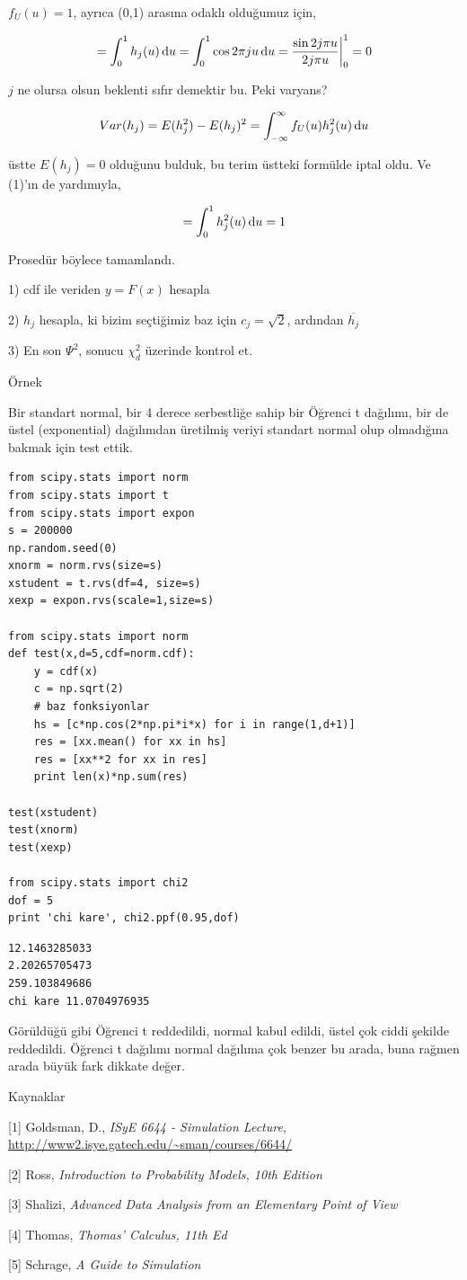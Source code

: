 \documentclass[12pt,fleqn]{article}\usepackage{../../common}
\begin{document}
$f_U(u) = 1$, ayrıca (0,1) arasına odaklı olduğumuz için,

$$
= \int _{0}^{1} h_j(u) \,\mathrm{d} u = \int_{0}^{1} \cos 2\pi j u \,\mathrm{d} u
= \frac{\sin 2j\pi u }{2j\pi u} \bigg|_{0}^{1} = 0
$$

$j$ ne olursa olsun beklenti sıfır demektir bu. Peki varyans? 

$$
Var(h_j) = E(h_j^2)-E(h_j)^2 = \int _{-\infty}^{\infty} f_U(u)h_j^2(u) \,\mathrm{d} u
$$

üstte $E(h_j)=0$ olduğunu bulduk, bu terim üstteki formülde iptal oldu. Ve
(1)'ın de yardımıyla,

$$  = \int_{0}^{1}  h_j^2(u) \,\mathrm{d} u = 1$$

Prosedür böylece tamamlandı. 

1) cdf ile veriden $y=F(x)$ hesapla

2) $h_j$ hesapla, ki bizim seçtiğimiz baz için $c_j = \sqrt{2}$, ardından $\overline{h_j}$

3) En son $\Psi^2$, sonucu $\chi^2_d$ üzerinde kontrol et. 

Örnek

Bir standart normal, bir 4 derece serbestliğe sahip bir Öğrenci t dağılımı,
bir de üstel (exponential) dağılımdan üretilmiş veriyi standart normal olup
olmadığına bakmak için test ettik. 

\begin{verbatim}
from scipy.stats import norm
from scipy.stats import t
from scipy.stats import expon
s = 200000
np.random.seed(0)
xnorm = norm.rvs(size=s)
xstudent = t.rvs(df=4, size=s)
xexp = expon.rvs(scale=1,size=s)

from scipy.stats import norm
def test(x,d=5,cdf=norm.cdf):
    y = cdf(x)
    c = np.sqrt(2)
    # baz fonksiyonlar
    hs = [c*np.cos(2*np.pi*i*x) for i in range(1,d+1)]
    res = [xx.mean() for xx in hs]
    res = [xx**2 for xx in res]
    print len(x)*np.sum(res)

test(xstudent)
test(xnorm)
test(xexp)

from scipy.stats import chi2
dof = 5
print 'chi kare', chi2.ppf(0.95,dof)
\end{verbatim}

\begin{verbatim}
12.1463285033
2.20265705473
259.103849686
chi kare 11.0704976935
\end{verbatim}

Görüldüğü gibi Öğrenci t reddedildi, normal kabul edildi, üstel çok ciddi
şekilde reddedildi. Öğrenci t dağılımı normal dağılıma çok benzer bu arada,
buna rağmen arada büyük fark dikkate değer.

Kaynaklar

[1] Goldsman, D., {\em ISyE 6644 - Simulation Lecture}, \url{http://www2.isye.gatech.edu/~sman/courses/6644/}

[2] Ross, {\em Introduction to Probability Models, 10th Edition}

[3] Shalizi, {\em Advanced Data Analysis from an Elementary Point of View}

[4] Thomas, {\em Thomas' Calculus, 11th Ed}

[5] Schrage, {\em A Guide to Simulation}
\end{document}
